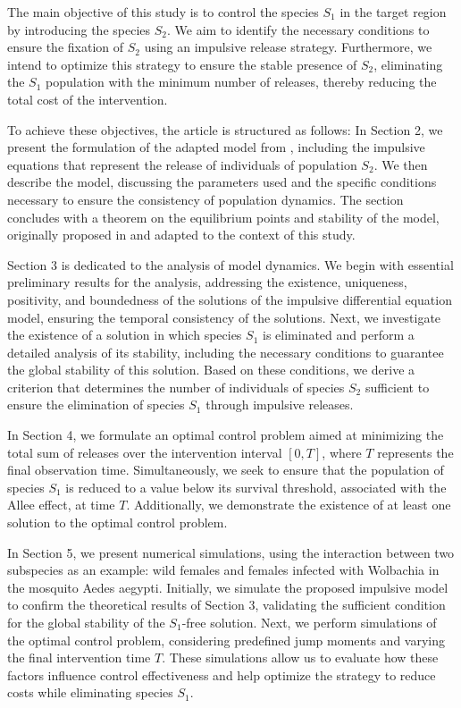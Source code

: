 \documentclass[10pt,letterpaper]{article}
\begin{document}
The main objective of this study is to control the species $S_1$ in the target region by introducing the species $S_2$. We aim to identify the necessary conditions to ensure the fixation of $S_2$ using an impulsive release strategy. Furthermore, we intend to optimize this strategy to ensure the stable presence of $S_2$, eliminating the $S_1$ population with the minimum number of releases, thereby reducing the total cost of the intervention.

To achieve these objectives, the article is structured as follows: In Section 2, we present the formulation of the adapted model from \cite{Campo2017}, including the impulsive equations that represent the release of individuals of population $S_2$. We then describe the model, discussing the parameters used and the specific conditions necessary to ensure the consistency of population dynamics. The section concludes with a theorem on the equilibrium points and stability of the model, originally proposed in \cite{Campo2017} and adapted to the context of this study.

Section 3 is dedicated to the analysis of model dynamics. We begin with essential preliminary results for the analysis, addressing the existence, uniqueness, positivity, and boundedness of the solutions of the impulsive differential equation model, ensuring the temporal consistency of the solutions. Next, we investigate the existence of a solution in which species $S_1$ is eliminated and perform a detailed analysis of its stability, including the necessary conditions to guarantee the global stability of this solution. Based on these conditions, we derive a criterion that determines the number of individuals of species $S_2$ sufficient to ensure the elimination of species $S_1$ through impulsive releases.

In Section 4, we formulate an optimal control problem aimed at minimizing the total sum of releases over the intervention interval $[0, T]$, where $T$ represents the final observation time. Simultaneously, we seek to ensure that the population of species $S_1$ is reduced to a value below its survival threshold, associated with the Allee effect, at time $T$. Additionally, we demonstrate the existence of at least one solution to the optimal control problem.

In Section 5, we present numerical simulations, using the interaction between two subspecies as an example: wild females and females infected with Wolbachia in the mosquito Aedes aegypti. Initially, we simulate the proposed impulsive model to confirm the theoretical results of Section 3, validating the sufficient condition for the global stability of the $S_1$-free solution. Next, we perform simulations of the optimal control problem, considering predefined jump moments and varying the final intervention time $T$. These simulations allow us to evaluate how these factors influence control effectiveness and help optimize the strategy to reduce costs while eliminating species $S_1$.
\end{document}
